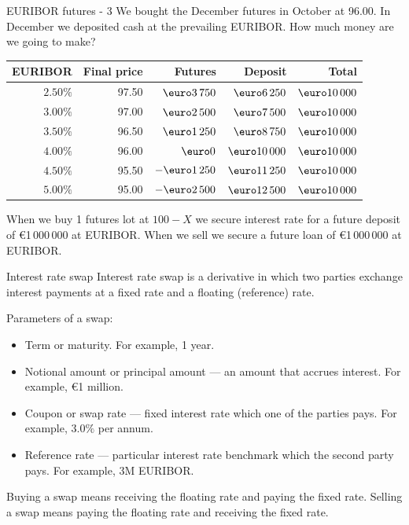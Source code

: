 \documentclass{beamer}
\renewcommand{\EUR}[1]{\textup{\euro}#1}
\begin{document}
\begin{frame}{EURIBOR futures - 3}
\justify
We bought the December futures in October at 96.00. In December we deposited cash at the prevailing EURIBOR. How much money are we going to make?\
\justify
\centering
\begin{tabular}{r|r|r|r|r}
EURIBOR   & Final price & Futures         & Deposit & Total \\ \hline
$2.50\%$ & 97.50        & $\EUR{3\,750}$      &   $\EUR{6\,250}$  & $\EUR{10\,000}$ \\
$3.00\%$ & 97.00        & $\EUR{2\,500}$      &   $\EUR{7\,500}$  & $\EUR{10\,000}$ \\
$3.50\%$ & 96.50        & $\EUR{1\,250}$      & $\EUR{8\,750}$  & $\EUR{10\,000}$ \\
$4.00\%$ & 96.00        & $\EUR{0}$                & $\EUR{10\,000}$  & $\EUR{10\,000}$ \\
$4.50\%$ & 95.50        & $-\EUR{1\,250}$    & $\EUR{11\,250}$ & $\EUR{10\,000}$ \\
$5.00\%$ & 95.00        & $-\EUR{2\,500}$    & $\EUR{12\,500}$ & $\EUR{10\,000}$
\end{tabular}

\justify
When we buy 1 futures lot at $100-X$ we secure interest rate for a future deposit of \EUR{1\,000\,000} at EURIBOR. When we sell we secure a future loan of \EUR{1\,000\,000} at EURIBOR.
\end{frame}



\begin{frame}{Interest rate swap}
\justify
\alert{Interest rate swap} is a derivative in which two parties exchange interest payments at a fixed rate and a floating (reference) rate.

\justify
Parameters of a swap:
\begin{itemize}
\justifying
\item Term or maturity. For example, 1 year.
\item Notional amount or principal amount --- an amount that accrues interest. For example, \EUR{1} million.
\item Coupon or swap rate --- fixed interest rate which one of the parties pays. For example, $3.0\%$ per annum.
\item Reference rate --- particular interest rate benchmark which the second party pays. For example, 3M EURIBOR.
\end{itemize}

\justify
Buying a swap means receiving the floating rate and paying the fixed rate. Selling a swap means paying the floating rate and receiving the fixed rate.
\end{frame}
\end{document}

